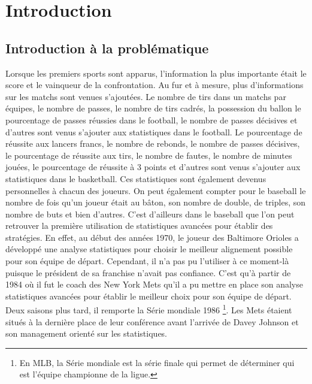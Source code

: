 \documentclass[12pt]{article}
\begin{document}
\newpage

\tableofcontents
\newpage

\section{Introduction}

\subsection{Introduction à la problématique}
\noindent Lorsque les premiers sports sont apparus, l'information la plus importante était le score et le vainqueur de la confrontation.
Au fur et à mesure, plus d'informations sur les matchs sont venues s'ajoutées.
Le nombre de tirs dans un matchs par équipes, le nombre de passes, le nombre de tirs cadrés, la possession du ballon le pourcentage de passes réussies dans le football, le nombre de passes décisives et d'autres sont venus s'ajouter aux statistiques dans le football.
Le pourcentage de réussite aux lancers francs, le nombre de rebonds, le nombre de passes décisives, le pourcentage de réussite aux tirs, le nombre de fautes, le nombre de minutes jouées, le pourcentage de réussite à 3 points et d'autres sont venus s'ajouter aux statistiques dans le basketball.
Ces statistiques sont également devenus personnelles à chacun des joueurs.
On peut également compter pour le baseball le nombre de fois qu'un joueur était au bâton, son nombre de double, de triples, son nombre de buts et bien d'autres.
\newline
C'est d'ailleurs dans le baseball que l'on peut retrouver la première utilisation de statistiques avancées pour établir des stratégies.
En effet, au début des années 1970, le joueur des Baltimore Orioles a développé une analyse statistiques pour choisir le meilleur alignement possible pour son équipe de départ.
Cependant, il n'a pas pu l'utiliser à ce moment-là puisque le président de sa franchise n'avait pas confiance. C'est qu'à partir de 1984 où il fut le coach des New York Mets qu'il a pu mettre en place son analyse statistiques avancées pour établir le meilleur choix pour son équipe de départ. \cite{incPCMag1984}
Deux saisons plus tard, il remporte la Série mondiale 1986 \footnote{En MLB, la Série mondiale est la série finale qui permet de déterminer qui est l'équipe championne de la ligue.}. Les Mets étaient situés à la dernière place de leur conférence avant l'arrivée de Davey Johnson et son management orienté sur les statistiques.
\end{document}
